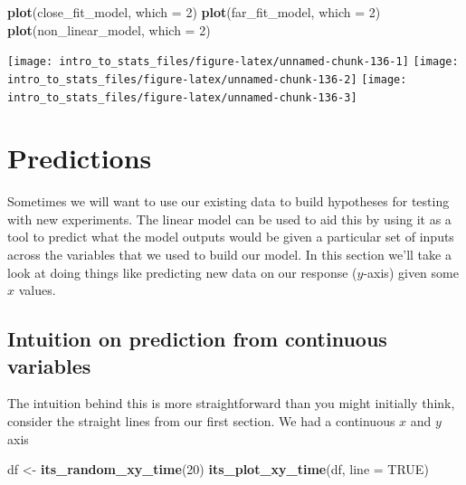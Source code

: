 \documentclass[
]{book}
\newenvironment{Shaded}{\begin{snugshade}}{\end{snugshade}}
\newcommand{\DataTypeTok}[1]{\textcolor[rgb]{0.13,0.29,0.53}{#1}}
\newcommand{\DecValTok}[1]{\textcolor[rgb]{0.00,0.00,0.81}{#1}}
\newcommand{\KeywordTok}[1]{\textcolor[rgb]{0.13,0.29,0.53}{\textbf{#1}}}
\newcommand{\NormalTok}[1]{#1}
\newcommand{\OtherTok}[1]{\textcolor[rgb]{0.56,0.35,0.01}{#1}}
\newcommand{\StringTok}[1]{\textcolor[rgb]{0.31,0.60,0.02}{#1}}
\begin{document}
\begin{Shaded}
\begin{Highlighting}[]
\KeywordTok{plot}\NormalTok{(close_fit_model, }\DataTypeTok{which =} \DecValTok{2}\NormalTok{)}
\KeywordTok{plot}\NormalTok{(far_fit_model, }\DataTypeTok{which =} \DecValTok{2}\NormalTok{)}
\KeywordTok{plot}\NormalTok{(non_linear_model, }\DataTypeTok{which =} \DecValTok{2}\NormalTok{)}
\end{Highlighting}
\end{Shaded}

\texttt{[image: intro\_to\_stats\_files/figure-latex/unnamed-chunk-136-1]} \texttt{[image: intro\_to\_stats\_files/figure-latex/unnamed-chunk-136-2]} \texttt{[image: intro\_to\_stats\_files/figure-latex/unnamed-chunk-136-3]}

\hypertarget{predictions}{%
\section{Predictions}\label{predictions}}

Sometimes we will want to use our existing data to build hypotheses for testing with new experiments. The linear model can be used to aid this by using it as a tool to predict what the model outputs would be given a particular set of inputs across the variables that we used to build our model. In this section we'll take a look at doing things like predicting new data on our response (\(y\)-axis) given some \(x\) values.

\hypertarget{intuition-on-prediction-from-continuous-variables}{%
\subsection{Intuition on prediction from continuous variables}\label{intuition-on-prediction-from-continuous-variables}}

The intuition behind this is more straightforward than you might initially think, consider the straight lines from our first section. We had a continuous \(x\) and \(y\) axis

\begin{Shaded}
\begin{Highlighting}[]
\NormalTok{df <-}\StringTok{ }\KeywordTok{its_random_xy_time}\NormalTok{(}\DecValTok{20}\NormalTok{)}
\KeywordTok{its_plot_xy_time}\NormalTok{(df, }\DataTypeTok{line =} \OtherTok{TRUE}\NormalTok{)}
\end{Highlighting}
\end{Shaded}
\end{document}
